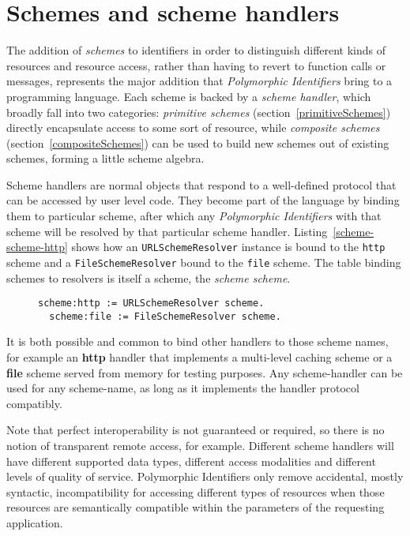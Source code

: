 \documentclass[preprint,authoryear]{llncs}
\begin{document}
\section{Schemes and scheme handlers}
\label{schemes}
The addition of \emph{schemes} to identifiers in order to distinguish different kinds of resources
and resource access, rather than having to revert to function calls or messages, represents
the major addition that \emph{Polymorphic Identifiers} bring to a programming language.
Each scheme is backed by a \emph{scheme handler}, which broadly fall into two categories:
 \emph{primitive schemes} (section~\ref{primitiveSchemes})
directly encapsulate access to some sort of resource, while \emph{composite schemes} (section~\ref{compositeSchemes})
can be used to build new schemes out of existing schemes, forming a little scheme algebra.


Scheme handlers are normal objects that respond to a well-defined protocol that can be
accessed by user level code.  They
become part of the language by binding them to particular scheme, after which
any \emph{Polymorphic Identifiers} with that scheme will be resolved by that particular scheme handler.
Listing~\ref{scheme-scheme-http} shows how an {\tt URLSchemeResolver} instance is bound
to the {\tt http} scheme and a {\tt FileSchemeResolver} bound to the {\tt file} scheme.  The table 
binding schemes to resolvers is itself a scheme, the \emph{scheme scheme}.

\begin{figure}[htbp]
\begin{lstlisting}[style=L,label=scheme-scheme-http,caption=Binding scheme handlers to the http and file schemes.]
  scheme:http := URLSchemeResolver scheme.
  scheme:file := FileSchemeResolver scheme.
\end{lstlisting}
\end{figure}

It is both possible and common to bind other handlers to those scheme
names, for example an {\bf http} handler that implements a multi-level caching scheme
or a {\bf file} scheme served from memory for testing purposes.  Any scheme-handler
can be used for any scheme-name, as long as it implements the handler protocol
compatibly.

Note that perfect interoperability is not guaranteed or required, so there is no notion
of transparent remote access, for example.  Different scheme handlers will have different supported
data types, different access modalities and different levels of quality of service.
Polymorphic Identifiers only remove accidental, mostly syntactic, incompatibility for accessing different types
of resources when those resources are semantically compatible within the parameters
of the requesting application.
\end{document}
